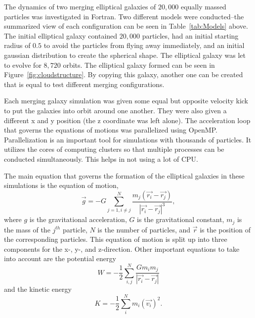 \documentclass[12pt]{report}
\begin{document}
The dynamics of two merging elliptical galaxies of $20,000$ equally massed particles was investigated in Fortran. Two different models were conducted--the summarized view of each configuration can be seen in Table~\ref{tab:Models} above. The initial elliptical galaxy contained $20,000$ particles, had an initial starting radius of $0.5$ to avoid the particles from flying away immediately, and an initial gaussian distribution to create the spherical shape. The elliptical galaxy was let to evolve for $8,720$ orbits. The elliptical galaxy formed can be seen in Figure~\ref{fig:cloudstructure}. By copying this galaxy, another one can be created that is equal to test different merging configurations.

 Each merging galaxy simulation was given some equal but opposite velocity kick to put the galaxies into orbit around one another. They were also given a different x and y position (the z coordinate was left alone). The acceleration loop that governs the equations of motions was parallelized using OpenMP. Parallelization is an important tool for simulations with thousands of particles. It utilizes the cores of computing clusters so that multiple processes can be conducted simultaneously. This helps in not using a lot of CPU.

The main equation that governs the formation of the elliptical galaxies in these simulations is the equation of motion,
\begin{equation} \label{eqn:equationofmotion}
    \vec{g} = -G \sum_{j=1, i \neq j}^{N} \frac{m_j \left( \vec{r_i} - \vec{r_j} \right)}{| \vec{r_i} - \vec{r_j} |^3},
\end{equation}
where $g$ is the gravitational acceleration, $G$ is the gravitational constant, $m_{j}$ is the mass of the $j^{th}$ particle, $N$ is the number of particles, and $\vec{r}$ is the position of the corresponding particles. This equation of motion is split up into three components for the x-, y-, and z-direction. Other important equations to take into account are the potential energy
\begin{equation}\label{eqn:potential_energy}
W = - \frac{1}{2} \sum_{i,j}^{N}
\frac{Gm_im_j}{| \vec{r_i} - \vec{r_j} |}    
\end{equation}
and the kinetic energy
\begin{equation}\label{eqn:kineticenergy}
K = - \frac{1}{2} \sum_{i}^N m_i \left( \vec{v_i} \right)^2.
\end{equation}
\end{document}
